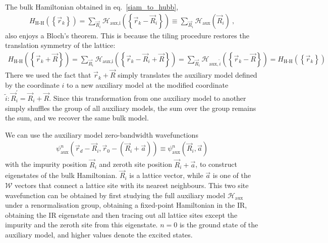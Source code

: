 \documentclass{report}
\numberwithin{equation}{section}
\begin{document}
The bulk Hamiltonian obtained in eq.~\ref{siam_to_hubb},
\begin{equation}\begin{aligned}
	H_\text{H-H}\left(\left\{\vec r_k\right\}\right) = \sum_{\vec R_i} \mathcal{H}_\text{aux,i}\left(\left\{\vec r_k - \vec R_i\right\}\right) \equiv \sum_{\vec R_i} \mathcal{H}_\text{aux}\left(\vec R_i\right)~,
\end{aligned}\end{equation}
also enjoys a Bloch's theorem. This is because the tiling procedure restores the translation symmetry of the lattice:
\begin{equation}\begin{aligned}
	H_\text{H-H}\left(\left\{\vec r_k + \vec R\right\}\right) =  \sum_{\vec R_i}\mathcal{H}_\text{aux,i}\left(\left\{\vec r_k - \vec R_i + \vec R\right\}\right) = \sum_{\vec R_i} \mathcal{H}_{\text{aux},\tilde i}\left(\left\{\vec r_k - \vec R\right\}\right) = H_\text{H-H}(\left\{\vec r_k\right\})
\end{aligned}\end{equation}
There we used the fact that \(\vec r_k + \vec R\) simply translates the auxiliary model defined by the coordinate \(i\) to a new auxiliary model at the modified coordinate \(\tilde i: \vec R_i^\prime = \vec R_i + \vec R\). Since this transformation from one auxiliary model to another simply shuffles the group of all auxiliary models, the sum over the group remains the sum, and we recover the same bulk model.

We can use the auxiliary model zero-bandwidth wavefunctions 
\begin{equation}\begin{aligned}
\psi^n_\text{aux}\left(\vec r_d - \vec R_i, \vec r_0 - \left(\vec R_i + \vec a\right)  \right) \equiv \psi^n_\text{aux}\left(\vec R_i, \vec a\right)
\end{aligned}\end{equation}
with the impurity position \(\vec R_i\) and zeroth site position \(\vec R_i + \vec a\), to construct eigenstates of the bulk Hamiltonian. \(\vec R_i\) is a lattice vector, while \(\vec a\) is one of the \(\mathcal{W}\) vectors that connect a lattice site with its nearest neighbours. This two site wavefunction can be obtained by first studying the full auxiliary model \(\mathcal{H}_\text{aux}\) under a renormalisation group, obtaining a fixed-point Hamiltonian in the IR, obtaining the IR eigenstate and then tracing out all lattice sites except the impurity and the zeroth site from this eigenstate. \(n=0\) is the ground state of the auxiliary model, and higher values denote the excited states.
\end{document}
